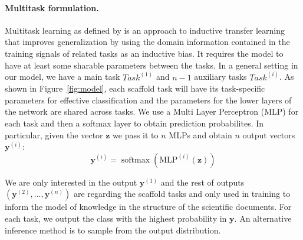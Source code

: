 \documentclass[11pt,a4paper]{article}
\newcommand{\V}[1][\mathbf]{#1}
\DeclareMathOperator{\softmax}{softmax}
\begin{document}
\paragraph{Multitask formulation.}
Multitask learning as defined by \citet{Caruana1997MultitaskL} is an approach to inductive transfer learning that improves generalization by using the domain information contained in the training signals of related tasks as an inductive bias. It requires the model to have at least some sharable parameters between the tasks. In a general setting in our model, we have a main task $Task^{(1)}$ and $n-1$ auxiliary tasks $Task^{(i)}$. As shown in Figure~\ref{fig:model}, each scaffold task will have its task-specific parameters for effective classification and the parameters for the lower layers of the network are shared across tasks. We use a Multi Layer Perceptron (MLP) for each task and then a softmax layer to obtain prediction probabilites. In particular, given the vector $\V{z}$ we pass it to $n$ MLPs and obtain $n$ output vectors $\V{y}^{(i)}$:
$$ \V{y}^{(i)} = \softmax(\mathrm{MLP}^{(i)}(\V{z})) $$

We are only interested in the output $\V{y}^{(1)}$ and the rest of outputs $(\V{y}^{(2)}, ..., \V{y}^{(n)})$ are regarding the scaffold tasks and only used in training to inform the model of knowledge in the structure of the scientific documents. For each task, we output the class with the highest probability in $\V{y}$. An alternative inference method is to sample from the output distribution.

\setlength{\dashlinedash}{0.5pt}
\setlength{\dashlinegap}{1.0pt}
\setlength{\arrayrulewidth}{0.1pt}
\end{document}
